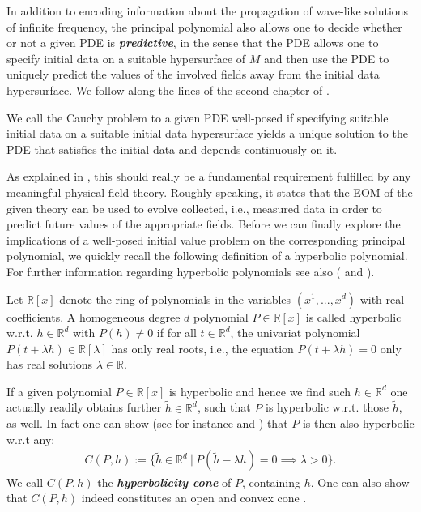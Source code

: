 In addition to encoding information about the propagation of wave-like solutions of infinite frequency, the principal polynomial also allows one to decide whether or not a given PDE is \textit{\textbf{predictive}}, in the sense that the PDE allows one to specify initial data on a suitable hypersurface of $M$ and then use the PDE to uniquely predict the values of the involved fields away from the initial data hypersurface. We follow along the lines of the second chapter of \cite{Rivera}.
\begin{definition}
We call the Cauchy problem to a given PDE well-posed if specifying suitable initial data on a suitable initial data hypersurface yields a unique solution to the PDE that satisfies the initial data and depends continuously on it.  
\end{definition}
As explained in \cite{Rivera}, this should really be a fundamental requirement fulfilled by any meaningful physical field theory. Roughly speaking, it states that the EOM of the given theory can be used to evolve collected, i.e., measured data in order to predict future values of the appropriate fields.
Before we can finally explore the implications of a well-posed initial value problem on the corresponding principal polynomial, we quickly recall the following definition of a hyperbolic polynomial. For further information regarding hyperbolic polynomials see also (\cite{2012arXiv1212.6696K} and \cite{Bauschke98hyperbolicpolynomials}).
\begin{definition}
Let $\mathbb{R}[x]$ denote the ring of polynomials in the variables $(x^1,...,x^d)$ with real coefficients.
A homogeneous degree $d$ polynomial $P \in \mathbb{R}[x]$ is called hyperbolic w.r.t. $h\in \mathbb{R}^d$ with $P(h) \neq 0$ if for all $t\in \mathbb{R}^d$, the univariat polynomial
$P(t + \lambda h) \in \mathbb{R}[\lambda]$ has only real roots, i.e.,
the equation $P(t + \lambda h)=0$ only has real solutions $\lambda \in \mathbb{R}$.
\end{definition}
If a given polynomial $P \in \mathbb{R}[x]$ is hyperbolic and hence we find such $h\in \mathbb{R}^d$ one actually readily obtains further $\tilde{h}\in \mathbb{R}^d$, such that $P$ is hyperbolic w.r.t. those $\tilde{h}$, as well. In fact one can show (see for instance \cite{Rivera} and \cite{10.2307/24900665}) that $P$ is then also hyperbolic w.r.t any: 
\begin{align}
    C(P,h) := \{ \tilde{h} \in \mathbb{R}^d \ \vert \ P(\tilde{h}- \lambda h) = 0 \implies \lambda > 0\}.
\end{align}
We call $C(P,h)$ the \textbf{\textit{hyperbolicity cone}} of $P$, containing $h$. One can also show that $C(P,h)$ indeed constitutes an open and convex cone \cite{10.2307/24900665}.

